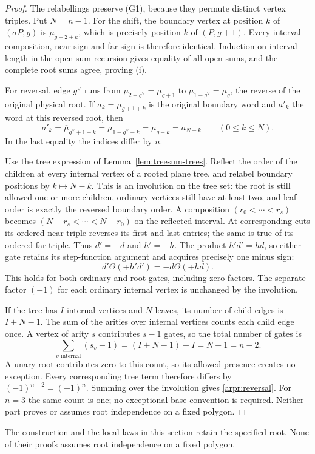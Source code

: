 \begin{proof}
The relabellings preserve (G1), because they permute distinct vertex
triples. Put $N=n-1$. For the shift, the boundary vertex at position
$k$ of $(\sigma P,g)$ is $\mu_{g+2+k}$, which is precisely position
$k$ of $(P,g+1)$. Every interval composition, near sign and far sign
is therefore identical. Induction on interval length in the open-sum
recursion gives equality of all open sums, and the complete root sums
agree, proving (i).

For reversal, edge $g^\vee$ runs from
$\mu_{2-g^\vee}=\mu_{g+1}$ to
$\mu_{1-g^\vee}=\mu_g$, the reverse of the original physical root.
If $a_k=\mu_{g+1+k}$ is the original boundary word and $a'_k$ the
word at this reversed root, then
\begin{equation}\label{arpr:boundary}
a'_k=\overline\mu_{g^\vee+1+k}
     =\mu_{1-g^\vee-k}=\mu_{g-k}=a_{N-k}
\qquad(0\leq k\leq N).
\end{equation}
In the last equality the indices differ by $n$.

Use the tree expression of Lemma~\ref{lem:treesum-trees}.
Reflect the order of the children at every internal vertex of a
rooted plane tree, and relabel boundary positions by $k\mapsto N-k$.
This is an involution on the tree set: the root is still allowed one
or more children, ordinary vertices still have at least two, and leaf
order is exactly the reversed boundary order. A composition
$(r_0<\cdots<r_s)$ becomes
$(N-r_s<\cdots<N-r_0)$ on the reflected interval. At corresponding
cuts its ordered near triple reverses its first and last entries;
the same is true of its ordered far triple. Thus $d'=-d$ and $h'=-h$.
The product $h'd'=hd$, so either gate retains its step-function
argument and acquires precisely one minus sign:
\begin{equation}\label{arpr:gate}
d'\Theta(\mp h'd')=-d\Theta(\mp hd).
\end{equation}
This holds for both ordinary and root gates, including zero factors.
The separate factor $(-1)$ for each ordinary internal vertex is
unchanged by the involution.

If the tree has $I$ internal vertices and $N$ leaves, its number of
child edges is $I+N-1$. The sum of the arities over internal vertices
counts each child edge once. A vertex of arity $s$ contributes $s-1$
gates, so the total number of gates is
\begin{equation}\label{arpr:gate-count}
\sum_{v\text{ internal}}(s_v-1)
=(I+N-1)-I=N-1=n-2.
\end{equation}
A unary root contributes zero to this count, so its allowed presence
creates no exception. Every corresponding tree term therefore differs
by $(-1)^{n-2}=(-1)^n$. Summing over the involution gives
\eqref{arpr:reversal}. For $n=3$ the same count is one; no exceptional
base convention is required. Neither part proves or assumes root
independence on a fixed polygon.
\end{proof}

\begin{remark}\label{thm:root-independence}
The construction and the local laws in this section retain the specified
root. None of their proofs assumes root independence on a fixed polygon.
\end{remark}
